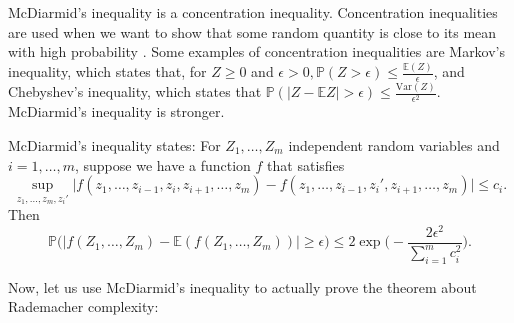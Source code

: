 \documentclass[twoside]{article}
\theoremstyle{definition}
\theoremstyle{definition}
\theoremstyle{remark}
\begin{document}
McDiarmid's inequality is a concentration inequality. Concentration inequalities are used when we want to show that some random quantity is close to its mean with high probability \cite{concentration}. Some examples of concentration inequalities are Markov's inequality, which states that, for $Z \geq 0$ and $\epsilon > 0, \mathbb{P}(Z > \epsilon) \leq \frac{\mathbb{E}(Z)}{\epsilon}$, and Chebyshev's inequality, which states that $\mathbb{P}(|Z - \mathbb{E}Z| > \epsilon) \leq \frac{\text{Var}(Z)}{\epsilon^2}$. McDiarmid's inequality is stronger.

McDiarmid's inequality states: For $Z_1, \ldots, Z_m$ independent random variables and $i = 1,\ldots,m$, suppose we have a function $f$ that satisfies
\[
\sup \limits_{z_1, \ldots, z_m, z_i'} \Bigg| f(z_1,\ldots,z_{i-1}, z_i, z_{i+1}, \ldots, z_m) - f(z_1, \ldots, z_{i-1}, z_i', z_{i+1}, \ldots, z_m)\Bigg| \leq c_i.
\]
Then
\[
\mathbb{P}\Bigg( \Big| f(Z_1,\ldots,Z_m) - \mathbb{E}(f(Z_1,\ldots,Z_m)) \Big| \geq \epsilon \Bigg) \leq 2\exp \bigg(-\frac{2\epsilon^2}{\sum \limits_{i=1}^m c_i^2} \bigg).
\]

Now, let us use McDiarmid's inequality to actually prove the theorem about Rademacher complexity:
\end{document}
